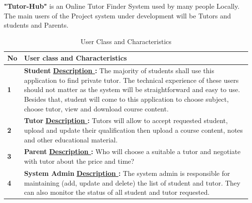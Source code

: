 \textbf{"Tutor-Hub"} is an Online Tutor Finder System used by many people Locally. The main users of the Project system under development will be Tutors and students and Parents.
\begin{center}
\setlength{\tabcolsep}{1.0cm}
\renewcommand{\arraystretch}{1.5}
    \begin{table}[ht]
        \centering
        \begin{tabular}{|m{70pt}|p{9cm}|}
            \hline
                \textbf{No}  & \textbf{ User class and Characteristics} \\
            \hline
                	\textbf{1 }& 
                     	\textbf{Student} \newline
                       \textbf{  \underline{Description }:} \newline
                		The majority of students shall use this application to find private tutor. The technical
                        experience of these users should not matter as the system will be straightforward and
                        easy to use. Besides that, student will come to this application to choose subject,
                        choose tutor, view and download course content.\\
            \hline
                    \textbf{2} &
                        \textbf{Tutor} \newline
                        \textbf{  \underline{Description }:} \newline
                        Tutors will allow to accept requested student, upload and update their qualification
                        then upload a course content, notes and other educational material.\\
            \hline
                    \textbf{3} &  
                        \textbf{Parent} \newline
                        \textbf{  \underline{Description }:} \newline
                        Who will choose a suitable a tutor and negotiate with tutor about the price and time?\\
            \hline
                   \textbf{ 4} &  
                        \textbf{System Admin} \newline
                        \textbf{  \underline{Description }:} \newline
                        The system admin is responsible for maintaining (add, update and delete) the list of
                        student and tutor. They can also monitor the status of all student and tutor requested.\\
            \hline  
        \end{tabular}
        \caption{User Class and Characteristics}
        \label{tab:my_label}
    \end{table}
\end{center}
